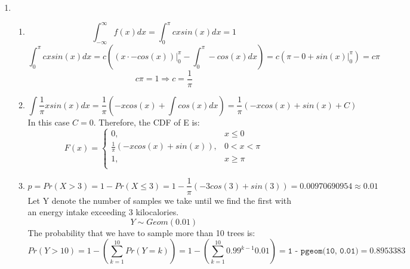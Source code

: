 \documentclass[11pt]{article}
\begin{document}
\begin{enumerate}[label=\textbf{Question \arabic*:},start=1]
\begin{enumerate}
\end{enumerate}




\item 
\begin{enumerate}
  \item 
\[
\int_{-\infty}^{\infty} f(x) dx = \int_{0}^{\pi} cx sin(x) dx = 1
\]
\[
 \int_{0}^{\pi} cx sin(x) dx = c( (x \cdot -cos(x))|_{0}^{\pi} - \int_{0}^{\pi} -cos(x)dx ) = c (\pi - 0 + sin(x) |_{0}^{\pi}) = c \pi
\]
\[
c \pi = 1 \Rightarrow c = \frac{1}{\pi}
\]

  \item 
\[
 \int \frac{1}{\pi} x sin(x) dx = \frac{1}{\pi}( -xcos(x) + \int cos(x)dx ) = \frac{1}{\pi} (-xcos(x) + sin(x) + C)
\]
In this case $C = 0$. Therefore, the CDF of E is:
\[
F(x) = \begin{cases}
        0, & x \leq 0\\
        \frac{1}{\pi} (-xcos(x) + sin(x)), & 0 < x < \pi\\
        1, & x \ge \pi\\
        \end{cases}
\]


  \item 
\[
p = Pr(X > 3) = 1 - Pr(X \leq 3) = 1 - \frac{1}{\pi}(-3 cos(3) + sin(3)) = 0.00970690954 \approx 0.01
\]
Let Y denote the number of samples we take until we find the first with an energy intake exceeding 3 kilocalories. \\
\[
Y \sim Geom(0.01)
\]
The probability that we have to sample more than 10 trees is:
\[
Pr(Y > 10) = 1 - (\sum_{k=1}^{10} Pr(Y = k) ) = 1 - (\sum_{k=1}^{10} 0.99^{k-1} 0.01) = \texttt{1 - pgeom(10, 0.01)} = 0.8953383
\]



\end{enumerate}

\end{enumerate}
\end{document}
